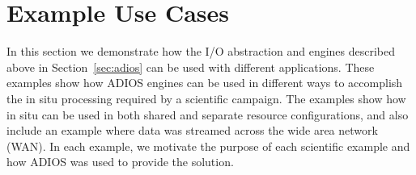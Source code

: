 \documentclass[x11names,table,xcdraw,graybox]{svmult}
\begin{document}

%
\section{Example Use Cases}
\label{sec:examples}

In this section we demonstrate how the I/O abstraction and engines described above in Section~\ref{sec:adios} can be used with different applications. These examples show how ADIOS engines can be used in different ways to accomplish the in situ processing required by a scientific campaign. The examples show how in situ can be used in both shared and separate resource configurations, and also include an example where data was streamed across the wide area network (WAN). In each example, we motivate the purpose of each scientific example and how ADIOS was used to provide the solution.
\end{document}
